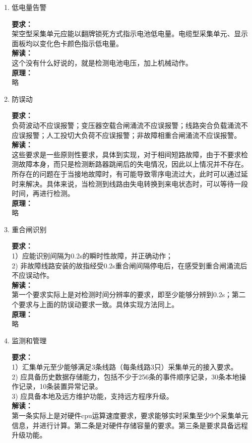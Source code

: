 \documentclass{article}
\begin{document}
\begin{CJK}{UTF8}{gbsn}
\begin{enumerate}
\item 低电量告警
	\par
	\textbf{要求：}\\
	架空型采集单元应能以翻牌锁死方式指示电池低电量。电缆型采集单元、显示面板均以变化色卡颜色指示低电量。\\
	\textbf{解读：}\\
	这个没有什么好说的，就是检测电池电压，加上机械动作。\\
	\textbf{原理：}\\
	略
\item 防误动
	\par
	\textbf{要求：}\\
	负荷波动不应误报警；变压器空载合闸涌流不应误报警；线路突合负载涌流不应误报警；人工投切大负荷不应误报警；非故障相重合闸涌流不应误报警。\\
	\textbf{解读：}\\
	这些要求是一些原则性要求，具体到实现，对于相间短路故障，由于不要求检测故障本身，而只是检测断路器跳闸后的失电情况，因此以上情况并不存在。所存在的问题在于当接地故障时，有可能导致零序电流过大，此时可以通过延时来解决。具体来说，当检测到线路由失电转换到来电状态时，可以等待一段时间，再进行检测。\\
	\textbf{原理：}\\
	略
\item 重合闸识别
	\par
	\textbf{要求：}\\
	1）应能识别间隔为0.2s的瞬时性故障，并正确动作；\\
	2) 非故障线路安装的故指经受0.2s重合闸间隔停电后，在感受到重合闸涌流后不应误动作。\\
	\textbf{解读：}\\
	第一个要求实际上是对检测时间分辨率的要求，即至少能够分辨到0.2s；第二个要求与上面的防误动要求一致。具体实现方法同上。\\
	\textbf{原理：}\\
	略
\item 监测和管理
	\par
	\textbf{要求：}\\
	1）汇集单元至少能够满足3条线路（每条线路3只）采集单元的接入要求。\\
	2) 应具备历史数据存储能力，包括不少于256条的事件顺序记录，30条本地操作记录，10条装置异常记录。\\
	3) 应具备本地及远方维护功能，支持远方程序升级。\\
	\textbf{解读：}\\
	第一条实际上是对硬件cpu运算速度要求，要求能够实时采集至少9个采集单元信息，并进行计算。第二条是对硬件存储容量的要求。第三条是要求具备远程升级功能。\\

\end{enumerate}
\end{CJK}
\end{document}
